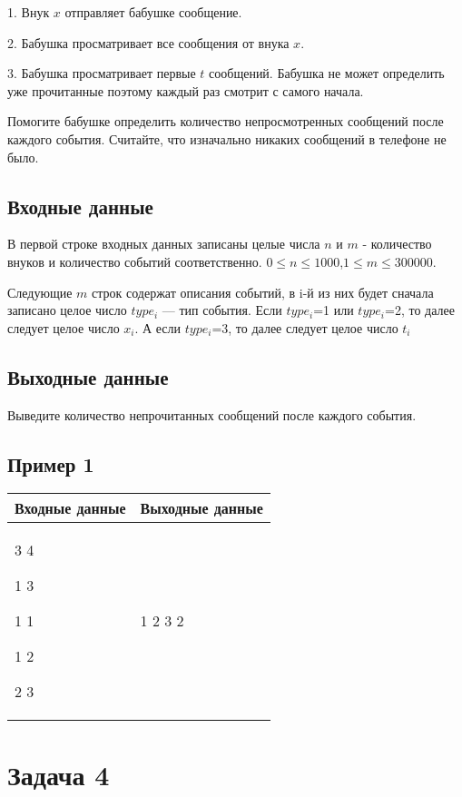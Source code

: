 \documentclass[a4]{article}
\begin{document}
1. Внук $x$ отправляет бабушке сообщение.

2. Бабушка просматривает все сообщения от внука $x$.

3. Бабушка просматривает первые $t$ сообщений. Бабушка не может определить уже прочитанные поэтому каждый раз смотрит с самого начала.

Помогите бабушке определить количество непросмотренных сообщений после каждого события. Считайте, что изначально никаких сообщений в телефоне не было.

\subsection*{Входные данные}
\label{sec:orgeb4908d}
В первой строке входных данных записаны целые числа $n$ и $m$ - количество внуков и количество событий соответственно. $0\leq n \leq 1000$,$1 \leq m \leq 300000$.

Следующие $m$ строк содержат описания событий, в i-й из них будет сначала записано целое число $type_i$ — тип события. Если $type_i$=1 или $type_i$=2, то далее следует целое число $x_i$. А если $type_i$=3, то далее следует целое число $t_i$ 
\subsection*{Выходные данные}
\label{sec:orged795e8}
Выведите количество непрочитанных сообщений после каждого события.
\subsection*{Пример 1}
\label{sec:org6a26c04}

\begin{table}[H]
\begin{center}
\begin{tabular}{|m{4cm}|m{4cm}|}
\hline
Входные данные & Выходные данные \\ \hline
3 4

1 3

1 1

1 2

2 3
&
1 2 3 2
\\ \hline
\end{tabular}
\end{center}
\end{table}
\pagebreak
\section*{Задача 4}
\label{sec:org570b899}
\end{document}
